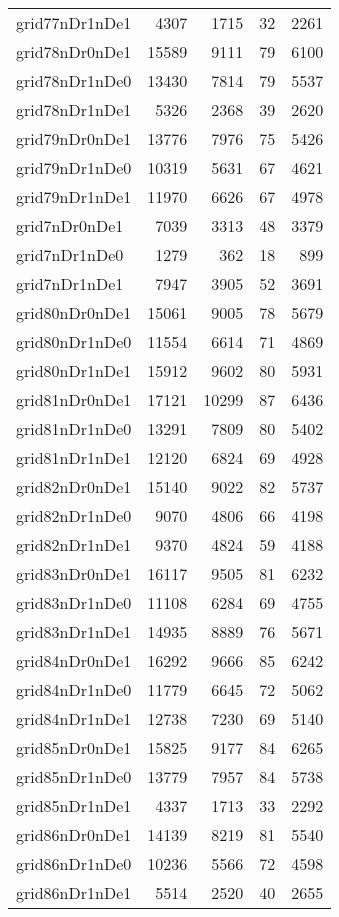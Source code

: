 \begin{longtable}{lrrrr}
grid77nDr1nDe1 & 4307 & 1715 & 32 & 2261 \\
grid78nDr0nDe1 & 15589 & 9111 & 79 & 6100 \\
grid78nDr1nDe0 & 13430 & 7814 & 79 & 5537 \\
grid78nDr1nDe1 & 5326 & 2368 & 39 & 2620 \\
grid79nDr0nDe1 & 13776 & 7976 & 75 & 5426 \\
grid79nDr1nDe0 & 10319 & 5631 & 67 & 4621 \\
grid79nDr1nDe1 & 11970 & 6626 & 67 & 4978 \\
grid7nDr0nDe1 & 7039 & 3313 & 48 & 3379 \\
grid7nDr1nDe0 & 1279 & 362 & 18 & 899 \\
grid7nDr1nDe1 & 7947 & 3905 & 52 & 3691 \\
grid80nDr0nDe1 & 15061 & 9005 & 78 & 5679 \\
grid80nDr1nDe0 & 11554 & 6614 & 71 & 4869 \\
grid80nDr1nDe1 & 15912 & 9602 & 80 & 5931 \\
grid81nDr0nDe1 & 17121 & 10299 & 87 & 6436 \\
grid81nDr1nDe0 & 13291 & 7809 & 80 & 5402 \\
grid81nDr1nDe1 & 12120 & 6824 & 69 & 4928 \\
grid82nDr0nDe1 & 15140 & 9022 & 82 & 5737 \\
grid82nDr1nDe0 & 9070 & 4806 & 66 & 4198 \\
grid82nDr1nDe1 & 9370 & 4824 & 59 & 4188 \\
grid83nDr0nDe1 & 16117 & 9505 & 81 & 6232 \\
grid83nDr1nDe0 & 11108 & 6284 & 69 & 4755 \\
grid83nDr1nDe1 & 14935 & 8889 & 76 & 5671 \\
grid84nDr0nDe1 & 16292 & 9666 & 85 & 6242 \\
grid84nDr1nDe0 & 11779 & 6645 & 72 & 5062 \\
grid84nDr1nDe1 & 12738 & 7230 & 69 & 5140 \\
grid85nDr0nDe1 & 15825 & 9177 & 84 & 6265 \\
grid85nDr1nDe0 & 13779 & 7957 & 84 & 5738 \\
grid85nDr1nDe1 & 4337 & 1713 & 33 & 2292 \\
grid86nDr0nDe1 & 14139 & 8219 & 81 & 5540 \\
grid86nDr1nDe0 & 10236 & 5566 & 72 & 4598 \\
grid86nDr1nDe1 & 5514 & 2520 & 40 & 2655 \\

\end{longtable}
